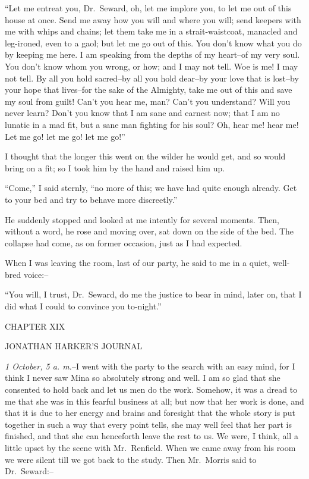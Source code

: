 \documentclass[12pt,openright]{book}
\begin{document}
“Let me entreat you, Dr. Seward, oh, let me implore you, to let me out of this house at once. Send me away how you will and where you will; send keepers with me with whips and chains; let them take me in a strait-waistcoat, manacled and leg-ironed, even to a gaol; but let me go out of this. You don’t know what you do by keeping me here. I am speaking from the depths of my heart–of my very soul. You don’t know whom you wrong, or how; and I may not tell. Woe is me! I may not tell. By all you hold sacred–by all you hold dear–by your love that is lost–by your hope that lives–for the sake of the Almighty, take me out of this and save my soul from guilt! Can’t you hear me, man? Can’t you understand? Will you never learn? Don’t you know that I am sane and earnest now; that I am no lunatic in a mad fit, but a sane man fighting for his soul? Oh, hear me! hear me! Let me go! let me go! let me go!”

I thought that the longer this went on the wilder he would get, and so would bring on a fit; so I took him by the hand and raised him up.

“Come,” I said sternly, “no more of this; we have had quite enough already. Get to your bed and try to behave more discreetly.”

He suddenly stopped and looked at me intently for several moments. Then, without a word, he rose and moving over, sat down on the side of the bed. The collapse had come, as on former occasion, just as I had expected.

When I was leaving the room, last of our party, he said to me in a quiet, well-bred voice:–

“You will, I trust, Dr. Seward, do me the justice to bear in mind, later on, that I did what I could to convince you to-night.”

CHAPTER XIX

JONATHAN HARKER’S JOURNAL

\textit{1 October, 5 a. m.}–I went with the party to the search with an easy mind, for I think I never saw Mina so absolutely strong and well. I am so glad that she consented to hold back and let us men do the work. Somehow, it was a dread to me that she was in this fearful business at all; but now that her work is done, and that it is due to her energy and brains and foresight that the whole story is put together in such a way that every point tells, she may well feel that her part is finished, and that she can henceforth leave the rest to us. We were, I think, all a little upset by the scene with Mr. Renfield. When we came away from his room we were silent till we got back to the study. Then Mr. Morris said to Dr. Seward:–
\end{document}
